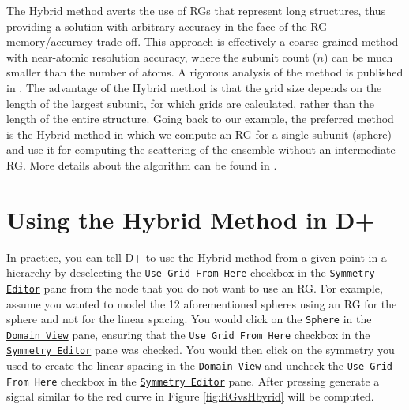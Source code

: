 \documentclass[../D+Manual.tex]{subfiles}
\begin{document}
	
	The Hybrid method averts the use of RGs that represent long structures, thus providing a solution with arbitrary accuracy in the face of the RG memory/accuracy trade-off.
	This approach is effectively a coarse-grained method with near-atomic resolution accuracy, where the subunit count ($n$) can be much smaller than the number of atoms. A rigorous analysis of the method is published in \cite{RGs2016}. The advantage of the Hybrid method is that the grid size depends on the length of the largest subunit, for which grids are calculated, rather than the length of the entire structure. Going back to our example, the preferred method is the Hybrid method in which we compute an RG for a single subunit (sphere) and use it for computing the scattering of the ensemble without an intermediate RG. More details about the algorithm can be found in \cite{RGs2016, Dplus2017}. 
\section{Using the Hybrid Method in D+}
\label{sec:UsingHybridMethod}
In practice, you can tell D+ to use the Hybrid method from a given point in a hierarchy by deselecting the \texttt{Use Grid From Here} checkbox in the \hyperref[sec:symmetryEditor]{\texttt{Symmetry Editor}} pane from the node that you do not want to use an RG.
For example, assume you wanted to model the 12 aforementioned spheres using an RG for the sphere and not for the linear spacing.
You would click on the \texttt{Sphere} in the \hyperref[sec:domainView]{\texttt{Domain View}} pane, ensuring that the \texttt{Use Grid From Here} checkbox in the \hyperref[sec:symmetryEditor]{\texttt{Symmetry Editor}} pane was checked.
You would then click on the symmetry you used to create the linear spacing in the \hyperref[sec:domainView]{\texttt{Domain View}} and uncheck the \texttt{Use Grid From Here} checkbox in the \hyperref[sec:symmetryEditor]{\texttt{Symmetry Editor}} pane.
After pressing generate a signal similar to the red curve in Figure \ref*{fig:RGvsHbyrid} will be computed.
\end{document}
